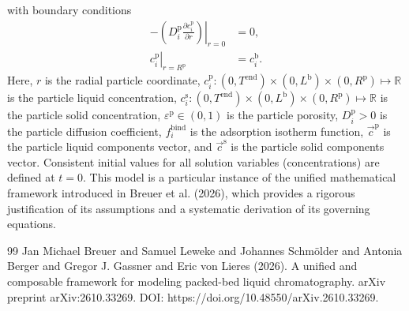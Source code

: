 \documentclass{article}
\begin{document}
with boundary conditions
\begin{align}
    - \left. \left( D^{\mathrm{p}}_{i} \frac{\partial c^{\mathrm{p}}_{i}}{\partial r} \right) \right|_{r=0}
    &= 0,
    \\
    \left. c^{\mathrm{p}}_{i} \right|_{r = R^{\mathrm{p}}}
    &= c^{\mathrm{b}}_{i}.
\end{align}
Here, $r$ is the radial particle coordinate, $c^{\mathrm{p}}_{i}\colon (0, T^{\mathrm{end}}) \times (0, L^{\mathrm{b}})\times (0, R^{\mathrm{p}}) \mapsto \mathbb{R}$ is the particle liquid concentration, $c^{\mathrm{s}}_{i}\colon (0, T^{\mathrm{end}}) \times (0, L^{\mathrm{b}})\times (0, R^{\mathrm{p}}) \mapsto \mathbb{R}$ is the particle solid concentration, $\varepsilon^{\mathrm{p}}\in (0, 1)$ is the particle porosity, $D^{\mathrm{p}}_{i}> 0$ is the particle diffusion coefficient, $f^{\mathrm{bind}}_{i}$ is the adsorption isotherm function, $\vec{c}^{\mathrm{p}}$ is the particle liquid components vector, and $\vec{c}^{\mathrm{s}}$ is the particle solid components vector.
Consistent initial values for all solution variables (concentrations) are defined at $t = 0$.
This model is a particular instance of the unified mathematical framework introduced in Breuer et al. (2026), which provides a rigorous justification of its assumptions and a systematic derivation of its governing equations.
\begin{thebibliography}{99}
     Jan Michael Breuer and Samuel Leweke and Johannes Schmölder and Antonia Berger and Gregor J. Gassner and Eric von Lieres (2026). A unified and composable framework for modeling packed-bed liquid chromatography. arXiv preprint arXiv:2610.33269. DOI: https://doi.org/10.48550/arXiv.2610.33269.
\end{thebibliography}
\end{document}
